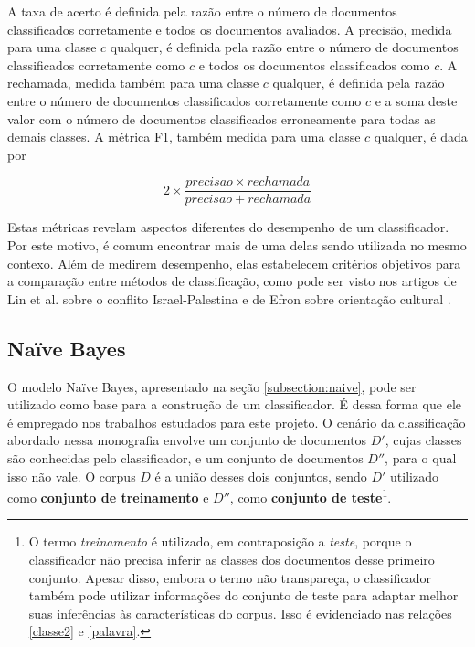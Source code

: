 A taxa de acerto é definida pela razão entre o número de documentos classificados corretamente e todos os documentos avaliados. A precisão, medida para uma classe \ensuremath{c} qualquer, é definida pela razão entre o número de documentos classificados corretamente como \ensuremath{c} e todos os documentos classificados como \ensuremath{c}. A rechamada, medida também para uma classe \ensuremath{c} qualquer, é definida pela razão entre o número de documentos classificados corretamente como \ensuremath{c} e a soma deste valor com o número de documentos classificados erroneamente para todas as demais classes. A métrica F1, também medida para uma classe \ensuremath{c} qualquer, é dada por

\begin{equation}
\ensuremath{2 \times \frac{precisao \times rechamada}{precisao + rechamada}}
\end{equation} 

Estas métricas revelam aspectos diferentes do desempenho de um classificador. Por este motivo, é comum encontrar mais de uma delas sendo utilizada no mesmo contexo. Além de medirem desempenho, elas estabelecem critérios objetivos para a comparação entre métodos de classificação, como pode ser visto nos artigos de Lin et al. sobre o conflito Israel-Palestina \cite{lin-et-al2006} e de Efron sobre orientação cultural \cite{efron}. 

\subsection{Naïve Bayes}
\label{subsection:bayes}

O modelo Naïve Bayes, apresentado na seção \ref{subsection:naive}, pode ser utilizado como base para a construção de um classificador. É dessa forma que ele é empregado nos trabalhos estudados para este projeto. O cenário da classificação abordado nessa monografia envolve um conjunto de documentos \ensuremath{D'}, cujas classes são conhecidas pelo classificador, e um conjunto de documentos \ensuremath{D''}, para o qual isso não vale. O corpus \ensuremath{D} é a união desses dois conjuntos, sendo \ensuremath{D'} utilizado como \textbf{conjunto de treinamento} e \ensuremath{D''}, como \textbf{conjunto de teste}\footnote{O termo \emph{treinamento} é utilizado, em contraposição a \emph{teste}, porque o classificador não precisa inferir as classes dos documentos desse primeiro conjunto. Apesar disso, embora o termo não transpareça, o classificador também pode utilizar informações do conjunto de teste para adaptar melhor suas inferências às características do corpus. Isso é evidenciado nas relações \ref{classe2} e \ref{palavra}.}.


